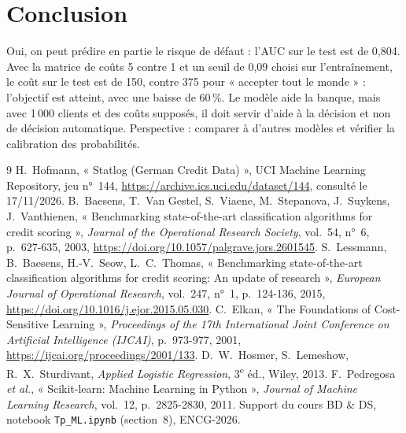 \documentclass[11pt,a4paper]{article}
\begin{document}
\section{Conclusion}
\label{sec:conclusion}
Oui, on peut prédire en partie le risque de défaut : l'AUC sur le test est de 0,804. Avec la matrice de coûts 5 contre 1 et un seuil de 0,09 choisi sur l'entraînement, le coût sur le test est de 150, contre 375 pour « accepter tout le monde » : l'objectif est atteint, avec une baisse de 60\,\%. Le modèle aide la banque, mais avec 1\,000 clients et des coûts supposés, il doit servir d'aide à la décision et non de décision automatique. Perspective : comparer à d'autres modèles et vérifier la calibration des probabilités.

\begin{thebibliography}{9}
   H.~Hofmann, « Statlog (German Credit Data) », UCI Machine Learning Repository, jeu n°~144, \url{https://archive.ics.uci.edu/dataset/144}, consulté le 17/11/2026.
   B.~Baesens, T.~Van Gestel, S.~Viaene, M.~Stepanova, J.~Suykens, J.~Vanthienen, « Benchmarking state-of-the-art classification algorithms for credit scoring », \textit{Journal of the Operational Research Society}, vol.~54, n°~6, p.~627-635, 2003, \url{https://doi.org/10.1057/palgrave.jors.2601545}.
   S.~Lessmann, B.~Baesens, H.-V.~Seow, L.~C.~Thomas, « Benchmarking state-of-the-art classification algorithms for credit scoring: An update of research », \textit{European Journal of Operational Research}, vol.~247, n°~1, p.~124-136, 2015, \url{https://doi.org/10.1016/j.ejor.2015.05.030}.
   C.~Elkan, « The Foundations of Cost-Sensitive Learning », \textit{Proceedings of the 17th International Joint Conference on Artificial Intelligence (IJCAI)}, p.~973-977, 2001, \url{https://ijcai.org/proceedings/2001/133}.
   D.~W.~Hosmer, S.~Lemeshow, R.~X.~Sturdivant, \textit{Applied Logistic Regression}, 3\textsuperscript{e} éd., Wiley, 2013.
   F.~Pedregosa \textit{et al.}, « Scikit-learn: Machine Learning in Python », \textit{Journal of Machine Learning Research}, vol.~12, p.~2825-2830, 2011.
   Support du cours BD \& DS, notebook \texttt{Tp\_ML.ipynb} (section~8), ENCG-2026.
\end{thebibliography}

\appendix
\end{document}
